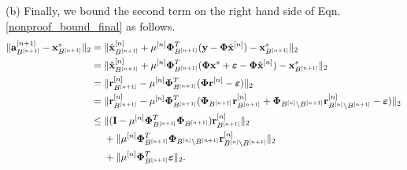 \documentclass{article}
\begin{document}
(b) Finally, we bound the second term on the right hand side of Eqn. \ref{nonproof_bound_final} as follows.
\begin{equation}\label{last_term_main_theorem}
    \begin{split}
       \|{{\bf a}}_{B^{[n+1]}}^{[n+1]} - {{\bf x}}_{B^{[n+1]}}^{s} \|_2 &= \|{\hat{\bf x}}_{B^{[n+1]}}^{[n]} + \mu^{[n]}{\bf \Phi}_{B^{[n+1]}}^T({\bf y}-{\bf \Phi} \hat{{\bf x}}^{[n]}) - {{\bf x}}_{B^{[n+1]}}^{s} \|_2\\
        &= \|{\hat{\bf x}}_{B^{[n+1]}}^{[n]} + \mu^{[n]}{\bf \Phi}_{B^{[n+1]}}^T({\bf \Phi} {\bf x}^s + \boldsymbol{\varepsilon}-{\bf \Phi} \hat{\bf x}^{[n]}) - {{\bf x}}_{B^{[n+1]}}^{s} \|_2\\
         &= \|{{\bf r}}_{B^{[n+1]}}^{[n]} - \mu^{[n]}{\bf \Phi}_{B^{[n+1]}}^T({\bf \Phi} {\bf r}^{[n]}  -\boldsymbol{\varepsilon}) \|_2\\
         &= \|{{\bf r}}_{B^{[n+1]}}^{[n]} - \mu^{[n]}{\bf \Phi}_{B^{[n+1]}}^T({\bf \Phi}_{B^{[n+1]}}{\bf r}^{[n]}_{B^{[n+1]}} + {\bf \Phi}_{B^{[n]}\backslash B^{[n+1]}}{\bf r}^{[n]}_{B^{[n]}\backslash B^{[n+1]}}  - \boldsymbol{\varepsilon}) \|_2\\
         &\leq \|({\boldsymbol{\rm I}} - \mu^{[n]}{\bf \Phi}_{B^{[n+1]}}^T{\bf \Phi}_{B^{[n+1]}}){\bf r}^{[n]}_{B^{[n+1]}}\|_2\\
         &\ \ \ \ + \|\mu^{[n]}{\bf \Phi}_{B^{[n+1]}}^T{\bf \Phi}_{B^{[n]}\backslash B^{[n+1]}}{\bf r}^{[n]}_{B^{[n]}\backslash B^{[n+1]}}\|_2\\
         &\ \ \ \ + \|\mu^{[n]}{\bf \Phi}_{B^{[n+1]}}^T\boldsymbol{\varepsilon}\|_2.
    \end{split}
\end{equation}
\end{document}
